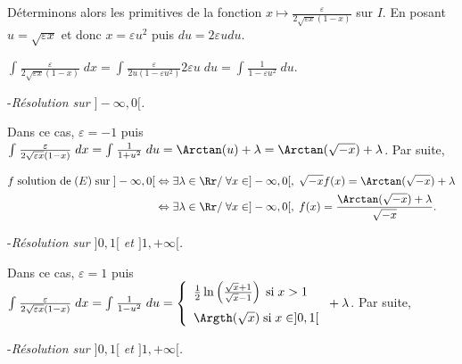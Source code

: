 {\begin{enumerate}
{Déterminons alors les primitives de la fonction $x\mapsto \frac{
 \varepsilon}{2\sqrt{\varepsilon x}(1-x)}$ sur $I$. En posant $u=\sqrt{\varepsilon x}$ et donc $x=\varepsilon u^2$ puis $du=2\varepsilon udu$.
 
\begin{center}
$\int_{}^{} \frac{
 \varepsilon}{2\sqrt{\varepsilon x}(1-x)}\;dx=\int_{}^{} \frac{\varepsilon}{2u(1-\varepsilon u^2)}2\varepsilon u\;du=\int_{}^{} \frac{1}{1-\varepsilon u^2}\;du$.
\end{center}

-\textit{Résolution sur $]-\infty,0[$.}

Dans ce cas, $\varepsilon =-1$ puis $\int_{}^{} \frac{
 \varepsilon}{2\sqrt{\varepsilon x}(1-x)}\;dx=\int_{}^{} \frac{1}{1+u^2}\;du=\Arctan(u)+\lambda=\Arctan(\sqrt{-x})+\lambda$. Par suite,
 
 \begin{align*}\ensuremath
 f\;\text{solution de}\;(E)\;\text{sur}\;]-\infty,0[&\Leftrightarrow\exists\lambda\in\Rr/\;\forall x\in]-\infty,0[,\;\sqrt{-x}f(x)=\Arctan(\sqrt{-x})+\lambda\\
  &\Leftrightarrow\exists\lambda\in\Rr/\;\forall x\in]-\infty,0[,\;f(x)= \frac{\Arctan(\sqrt{-x})+\lambda}{\sqrt{-x}}.
 \end{align*}

\begin{center}
\shadowbox{
$\mathcal{S}_{]-\infty,0[}=\left\{x\mapsto \frac{\Arctan(\sqrt{-x})+\lambda}{\sqrt{-x}},\;\lambda\in\Rr\right\}$.
}
\end{center}

-\textit{Résolution sur $]0,1[$ et $]1,+\infty[$.}

Dans ce cas, $\varepsilon =1$ puis $\int_{}^{} \frac{
 \varepsilon}{2\sqrt{\varepsilon x}(1-x)}\;dx=\int_{}^{} \frac{1}{1-u^2}\;du=\left\{
 \begin{array}{l}
  \frac{1}{2}\ln\left(
  \frac{\sqrt{x}+1}{\sqrt{x}-1}\right)\;\text{si}\;x>1
 \\
\rule{0mm}{5mm} \Argth(\sqrt{x})\;\text{si}\;x\in]0,1[
 \end{array}
 \right.+\lambda$. Par suite,

-\textit{Résolution sur $]0,1[$ et $]1,+\infty[$.}

\begin{center}
\shadowbox{
$\mathcal{S}_{]0,1[}=\left\{x\mapsto \frac{\Argth\left(\sqrt{x}\right)+\lambda}{\sqrt{x}},\;\lambda\in\Rr\right\}$ et $\mathcal{S}_{]1,+\infty[}=\left\{x\mapsto \frac{ \frac{1}{2}\ln\left(
  \frac{\sqrt{x}+1}{\sqrt{x}-1}\right)+\lambda}{\sqrt{x}},\;\lambda\in\Rr\right\}$.
}
\end{center}

}
\end{enumerate}}
